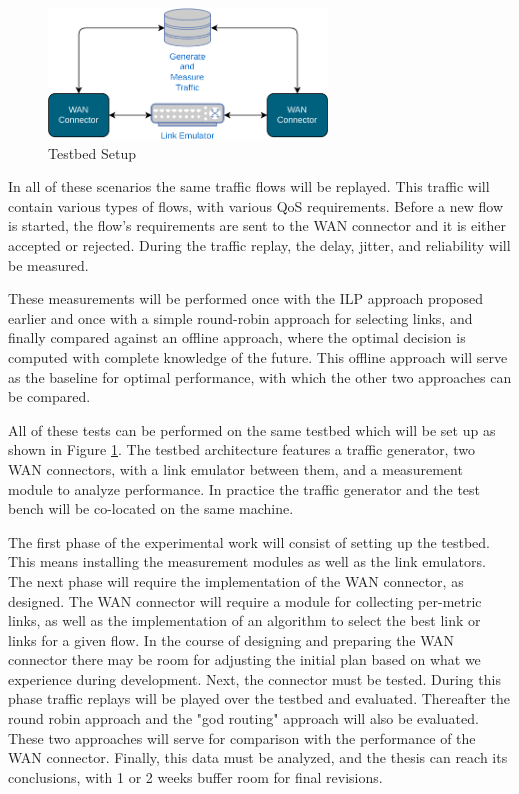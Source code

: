 \begin{figure}[h]
    \centering
        \includegraphics[width=0.66\textwidth]{fig/testbed.png}
        \caption{Testbed Setup}
        \label{fig:testbed}
\end{figure}

In all of these scenarios the same traffic flows will be replayed. This traffic will contain various types of flows, with various QoS requirements. Before a new flow is started, the flow's requirements are sent to the WAN connector and it is either accepted or rejected. During the traffic replay, the delay, jitter, and reliability will be measured.

These measurements will be performed once with the ILP approach proposed earlier and once with a simple round-robin approach for selecting links, and finally compared against an offline approach, where the optimal decision is computed with complete knowledge of the future. This offline approach will serve as the baseline for optimal performance, with which the other two approaches can be compared.

All of these tests can be performed on the same testbed which will be set up as shown in Figure \ref{fig:testbed}. The testbed architecture features a traffic generator, two WAN connectors, with a link emulator between them, and a measurement module to analyze performance. In practice the traffic generator and the test bench will be co-located on the same machine.




The first phase of the experimental work will consist of setting up the testbed. This means installing the measurement modules as well as the link emulators. The next phase will require the implementation of the WAN connector, as designed. The WAN connector will require a module for collecting per-metric links, as well as the implementation of an algorithm to select the best link or links for a given flow. In the course of designing and preparing the WAN connector there may be room for adjusting the initial plan based on what we experience during development. Next, the connector must be tested. During this phase traffic replays will be played over the testbed and evaluated. Thereafter the round robin approach and the "god routing" approach will also be evaluated. These two approaches will serve for comparison with the performance of the WAN connector. Finally, this data must be analyzed, and the thesis can reach its conclusions, with 1 or 2 weeks buffer room for final revisions.


